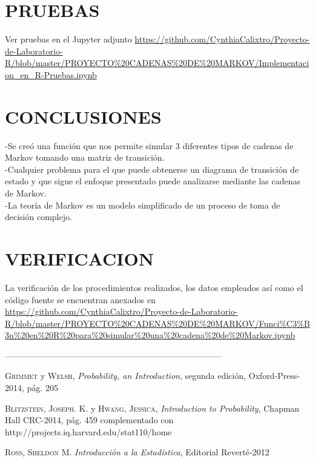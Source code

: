 \documentclass[10pt,a4paper]{article}
\theoremstyle{definition}
\theoremstyle{remark}
\begin{document}
\begin{multicols}{2}
\section{PRUEBAS}
Ver pruebas en el Jupyter adjunto  \url {https://github.com/CynthiaCalixtro/Proyecto-de-Laboratorio-R/blob/master/PROYECTO%20CADENAS%20DE%20MARKOV/Implementacion_en_R-Pruebas.ipynb}
\section{CONCLUSIONES}
\noindent -Se creó una función que nos permite simular 3 diferentes tipos de cadenas de Markov tomando una matriz de transición.\\
-Cualquier problema para el que puede obtenerse un diagrama de transición de estado y que sigue el enfoque presentado puede analizarse mediante las cadenas de Markov. \\
-La teoría de Markov es un modelo simplificado de un proceso de toma de decisión complejo. 
\section{VERIFICACION}
La verificación de los procedimientos realizados, los datos empleados así como el código fuente se encuentran anexados en \url{https://github.com/CynthiaCalixtro/Proyecto-de-Laboratorio-R/blob/master/PROYECTO%20CADENAS%20DE%20MARKOV/Funci%C3%B3n%20en%20R%20para%20simular%20una%20cadena%20de%20Markov.ipynb}
  
\end{multicols}
\begin{center}
 -----------------------------------------------------------------------------
\end{center}
\begin{multicols}{2}
\begin{list}{}{\setlength{\topsep}{0mm}\setlength{\itemsep}{0mm}%
\setlength{\parsep}{0mm}\setlength{\leftmargin}{4mm}}
%
\small
\item[1.]  \textsc{Grimmet} y \textsc{Welsh},
	\textit{Probability, an Introduction}, segunda edición, Oxford-Press-2014, pág. 205
	
\item[2.] \textsc{Blitzstein, Joseph. K.} y \textsc{Hwang, Jessica},
	\textit{Introduction to Probability}, Chapman Hall CRC-2014, pág. 459 complementado con http://projects.iq.harvard.edu/stat110/home
	
\item[3.] \textsc{Ross, Sheldon M.}
	\textit{Introducción a la Estadística}, Editorial Reverté-2012

%
\end{list}
\end{multicols}
\end{document}
